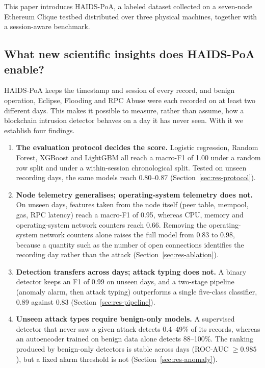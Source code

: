 \documentclass[journal]{IEEEtran}
\begin{document}
This paper introduces HAIDS-PoA, a labeled dataset collected on a seven-node Ethereum Clique testbed distributed over three physical machines, together with a session-aware benchmark.

\subsection{What new scientific insights does HAIDS-PoA enable?}
HAIDS-PoA keeps the timestamp and session of every record, and benign operation, Eclipse, Flooding and RPC Abuse were each recorded on at least two different days. This makes it possible to measure, rather than assume, how a blockchain intrusion detector behaves on a day it has never seen. With it we establish four findings.

\begin{enumerate}
\item \textbf{The evaluation protocol decides the score.} Logistic regression, Random Forest, XGBoost and LightGBM all reach a macro-F1 of 1.00 under a random row split and under a within-session chronological split. Tested on unseen recording days, the same models reach 0.80--0.87 (Section~\ref{sec:res-protocol}).
\item \textbf{Node telemetry generalises; operating-system telemetry does not.} On unseen days, features taken from the node itself (peer table, mempool, gas, RPC latency) reach a macro-F1 of 0.95, whereas CPU, memory and operating-system network counters reach 0.66. Removing the operating-system network counters alone raises the full model from 0.83 to 0.98, because a quantity such as the number of open connections identifies the recording day rather than the attack (Section~\ref{sec:res-ablation}).
\item \textbf{Detection transfers across days; attack typing does not.} A binary detector keeps an F1 of 0.99 on unseen days, and a two-stage pipeline (anomaly alarm, then attack typing) outperforms a single five-class classifier, 0.89 against 0.83 (Section~\ref{sec:res-pipeline}).
\item \textbf{Unseen attack types require benign-only models.} A supervised detector that never saw a given attack detects 0.4--49\% of its records, whereas an autoencoder trained on benign data alone detects 88--100\%. The ranking produced by benign-only detectors is stable across days (ROC-AUC $\geq 0.985$), but a fixed alarm threshold is not (Section~\ref{sec:res-anomaly}).
\end{enumerate}
\end{document}

